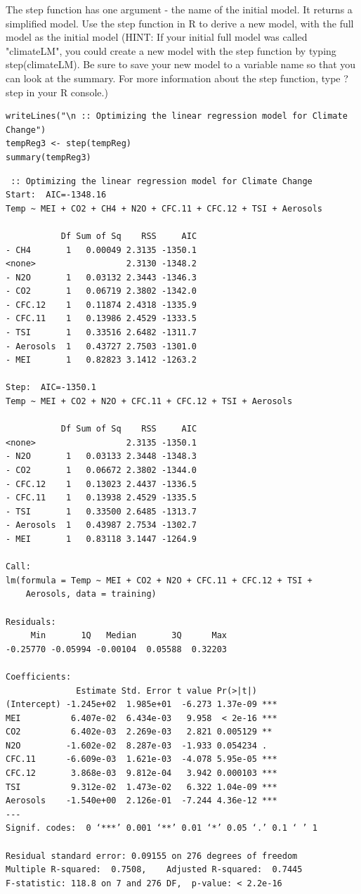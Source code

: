 \documentclass[letterpaper, 9pt, onecolumn, twoside, technote, final]{IEEEtran}
\begin{document}
The step function has one argument - the name of the initial model. It
returns a simplified model. Use the step function in R to derive a new
model, with the full model as the initial model (HINT: If your initial
full model was called "climateLM", you could create a new model with
the step function by typing step(climateLM). Be sure to save your new
model to a variable name so that you can look at the summary. For more
information about the step function, type ?step in your R console.)

\begin{verbatim}
writeLines("\n :: Optimizing the linear regression model for Climate Change")
tempReg3 <- step(tempReg)
summary(tempReg3)
\end{verbatim}

\begin{verbatim}
 :: Optimizing the linear regression model for Climate Change
Start:  AIC=-1348.16
Temp ~ MEI + CO2 + CH4 + N2O + CFC.11 + CFC.12 + TSI + Aerosols

           Df Sum of Sq    RSS     AIC
- CH4       1   0.00049 2.3135 -1350.1
<none>                  2.3130 -1348.2
- N2O       1   0.03132 2.3443 -1346.3
- CO2       1   0.06719 2.3802 -1342.0
- CFC.12    1   0.11874 2.4318 -1335.9
- CFC.11    1   0.13986 2.4529 -1333.5
- TSI       1   0.33516 2.6482 -1311.7
- Aerosols  1   0.43727 2.7503 -1301.0
- MEI       1   0.82823 3.1412 -1263.2

Step:  AIC=-1350.1
Temp ~ MEI + CO2 + N2O + CFC.11 + CFC.12 + TSI + Aerosols

           Df Sum of Sq    RSS     AIC
<none>                  2.3135 -1350.1
- N2O       1   0.03133 2.3448 -1348.3
- CO2       1   0.06672 2.3802 -1344.0
- CFC.12    1   0.13023 2.4437 -1336.5
- CFC.11    1   0.13938 2.4529 -1335.5
- TSI       1   0.33500 2.6485 -1313.7
- Aerosols  1   0.43987 2.7534 -1302.7
- MEI       1   0.83118 3.1447 -1264.9

Call:
lm(formula = Temp ~ MEI + CO2 + N2O + CFC.11 + CFC.12 + TSI +
    Aerosols, data = training)

Residuals:
     Min       1Q   Median       3Q      Max
-0.25770 -0.05994 -0.00104  0.05588  0.32203

Coefficients:
              Estimate Std. Error t value Pr(>|t|)
(Intercept) -1.245e+02  1.985e+01  -6.273 1.37e-09 ***
MEI          6.407e-02  6.434e-03   9.958  < 2e-16 ***
CO2          6.402e-03  2.269e-03   2.821 0.005129 **
N2O         -1.602e-02  8.287e-03  -1.933 0.054234 .
CFC.11      -6.609e-03  1.621e-03  -4.078 5.95e-05 ***
CFC.12       3.868e-03  9.812e-04   3.942 0.000103 ***
TSI          9.312e-02  1.473e-02   6.322 1.04e-09 ***
Aerosols    -1.540e+00  2.126e-01  -7.244 4.36e-12 ***
---
Signif. codes:  0 ‘***’ 0.001 ‘**’ 0.01 ‘*’ 0.05 ‘.’ 0.1 ‘ ’ 1

Residual standard error: 0.09155 on 276 degrees of freedom
Multiple R-squared:  0.7508,	Adjusted R-squared:  0.7445
F-statistic: 118.8 on 7 and 276 DF,  p-value: < 2.2e-16
\end{verbatim}
\end{document}
